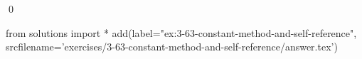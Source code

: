 
\begin{ex}
  \label{ex:3-63-constant-method-and-self-reference}
  
  \qed
\end{ex}
\begin{python0}
from solutions import *
add(label="ex:3-63-constant-method-and-self-reference",
    srcfilename='exercises/3-63-constant-method-and-self-reference/answer.tex')
\end{python0}
